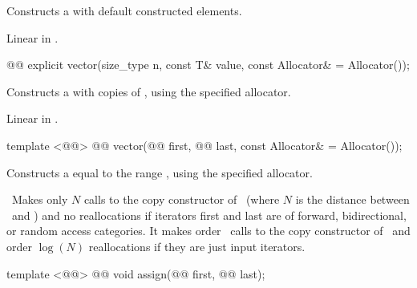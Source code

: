 \documentclass[american,twoside]{book}
\begin{document}
\begin{itemdescr}
\pnum
\effects Constructs a  with 
default constructed elements.

\pnum
{}

\pnum
\complexity Linear in .
\end{itemdescr}

\begin{itemdecl}
@@
explicit vector(size_type n, const T& value,
                const Allocator& = Allocator());
\end{itemdecl}

\begin{itemdescr}
\pnum
\effects Constructs a  with 
copies of , using the specified allocator.

\pnum
{}

\pnum
\complexity Linear in .
\end{itemdescr}

\begin{itemdecl}
template <@@>
  @@
  vector(@@ first, @@ last,
         const Allocator& = Allocator());
\end{itemdecl}

\begin{itemdescr}

\pnum
\effects Constructs a  equal to the
range , using the specified allocator.

\pnum
\complexity\ 
Makes only $N$
calls to the copy constructor of
\
(where $N$
is the distance between
\
and
)
and no reallocations if iterators first and last are of forward, bidirectional, or random access categories.
It makes order
\tcode{N}\
calls to the copy constructor of
\tcode{T}\
and order
$\log(N)$
reallocations if they are just input iterators.
\end{itemdescr}

%
\begin{itemdecl}
template <@@>
  @@
  void assign(@@ first, @@ last);
\end{itemdecl}
\end{document}

